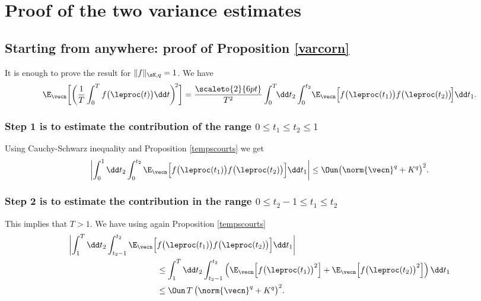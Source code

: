 \appendix

\section{Proof of the two variance estimates}\label{proof-variances}

\subsection{Starting from anywhere: proof of Proposition \ref{varcorn}}

It is enough to prove the result for $\|f\|_{\sK,q}=1$.
We have
\[
\E_{\vecn}\biggl[\biggl(\frac{1}{T}
\int_{0}^{T}f\bigl(\leproc(t)\bigr)\dd t\biggr)^{\!2}\biggr]
=\frac{\scaleto{2}{6pt}}{T^2}\int_{0}^{T}\!\!\dd t_{2}\int_{0}^{t_{2}}\!\E_{\vecn}\Bigl[
f\bigl(\leproc(t_{1})\bigr) f\bigl(\leproc(t_{2})\bigr)\!\Bigr]\dd t_{1}.
\]
\subsubsection*{Step 1 is to estimate the contribution of the range $0\le t_{1}\le t_{2}\le 1$} Using Cauchy-Schwarz inequality and Proposition \ref{tempscourts} we get
\[
\left|\int_{0}^{1}\dd t_{2}\int_{0}^{t_{2}}\E_{\vecn}\Bigl[
f\bigl(\leproc(t_{1})\bigr) f\bigl(\leproc(t_{2})\bigr)\Bigr]\dd t_{1}\right|
\le \Oun \bigl(\norm{\vecn}^{q}+K^{q}\bigr)^2.
\]
\subsubsection*{Step 2 is to estimate the contribution in the range $0\le
t_{2}-1\leq t_{1}\leq t_{2}$} This implies that $T>1$.
We have using again Proposition \ref{tempscourts}
\begin{align*}
\biggl|\int_{1}^{T} \dd t_{2}\int_{t_{2}-1}^{t_{2}}\E_{\vecn}
\Bigl[&f\bigl(\leproc(t_{1})\bigr) f\bigl(\leproc(t_{2})\bigr)\Bigr]\dd t_{1}\biggr|\\
& \le \int_{1}^{T} \dd t_{2}\int_{t_{2}-1}^{t_{2}}\left(\E_{\vecn}\Bigl[
f\bigl(\leproc(t_{1})\bigr)^2\Bigr]+ \E_{\vecn}\Bigl[f\bigl(\leproc(t_{2})\bigr)^2\Bigr]\right)\dd t_{1}\\
& \le \Oun \,T\,\bigl(\norm{\vecn}^{q}+K^{q}\bigr)^2.
\end{align*}

